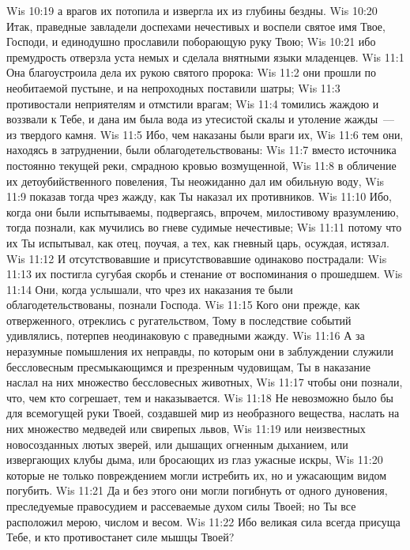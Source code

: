 \vs Wis 10:19 а врагов их потопила и извергла их из глубины бездны.
\vs Wis 10:20 Итак, праведные завладели доспехами нечестивых и воспели святое имя Твое, Господи, и единодушно прославили поборающую руку Твою;
\vs Wis 10:21 ибо премудрость отверзла уста немых и сделала внятными языки младенцев.
\vs Wis 11:1 Она благоустроила дела их рукою святого пророка:
\vs Wis 11:2 они прошли по необитаемой пустыне, и на непроходных  поставили шатры;
\vs Wis 11:3 противостали неприятелям и отмстили врагам;
\vs Wis 11:4 томились жаждою и воззвали к Тебе, и дана им была вода из утесистой скалы и утоление жажды~--- из твердого камня.
\vs Wis 11:5 Ибо, чем наказаны были враги их,
\vs Wis 11:6 тем они, находясь в затруднении, были облагодетельствованы:
\vs Wis 11:7 вместо источника постоянно текущей реки, смрадною кровью возмущенной,
\vs Wis 11:8 в обличение их детоубийственного повеления, Ты неожиданно дал им обильную воду,
\vs Wis 11:9 показав тогда чрез жажду, как Ты наказал их противников.
\vs Wis 11:10 Ибо, когда они были испытываемы, подвергаясь, впрочем, милостивому вразумлению, тогда познали, как мучились во гневе судимые нечестивые;
\vs Wis 11:11 потому что их Ты испытывал, как отец, поучая, а тех, как гневный царь, осуждая, истязал.
\vs Wis 11:12 И отсутствовавшие и присутствовавшие одинаково пострадали:
\vs Wis 11:13 их постигла сугубая скорбь и стенание от воспоминания о прошедшем.
\vs Wis 11:14 Они, когда услышали, что чрез их наказания те были облагодетельствованы, познали Господа.
\vs Wis 11:15 Кого они прежде, как отверженного, отреклись с ругательством, Тому в последствие событий удивлялись, потерпев неодинаковую с праведными жажду.
\vs Wis 11:16 А за неразумные помышления их неправды, по которым они в заблуждении служили бессловесным пресмыкающимся и презренным чудовищам, Ты в наказание наслал на них множество бессловесных животных,
\vs Wis 11:17 чтобы они познали, что, чем кто согрешает, тем и наказывается.
\vs Wis 11:18 Не невозможно было бы для всемогущей руки Твоей, создавшей мир из необразного вещества, наслать на них множество медведей или свирепых львов,
\vs Wis 11:19 или неизвестных новосозданных лютых зверей, или дышащих огненным дыханием, или извергающих клубы дыма, или бросающих из глаз ужасные искры,
\vs Wis 11:20 которые не только повреждением могли истребить их, но и ужасающим видом погубить.
\vs Wis 11:21 Да и без этого они могли погибнуть от одного дуновения, преследуемые правосудием и рассеваемые духом силы Твоей; но Ты все расположил мерою, числом и весом.
\vs Wis 11:22 Ибо великая сила всегда присуща Тебе, и кто противостанет силе мышцы Твоей?
